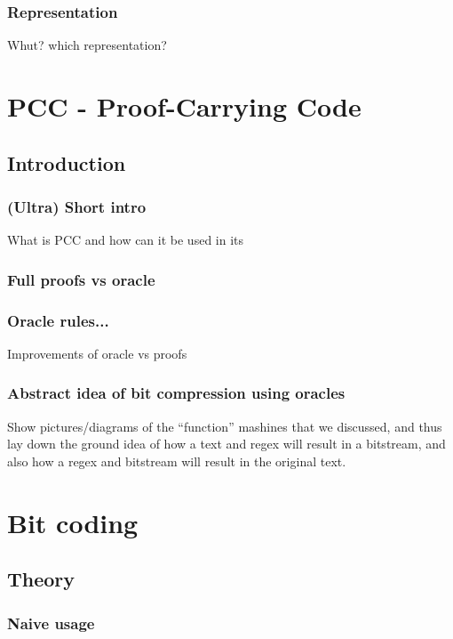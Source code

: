 \documentclass[slidestop,compress,mathserif, xcolor=table]{beamer}
\begin{document}
\begin{frame}
  \frametitle{Representation}
  
  Whut? which representation?

\end{frame}


\section{PCC - Proof-Carrying Code}

\subsection{Introduction}

\begin{frame}
  \frametitle{(Ultra) Short intro}
  
  What is PCC and how can it be used in its 

\end{frame}

\begin{frame}
  \frametitle{Full proofs vs oracle}
  
\end{frame}

\begin{frame}
  \frametitle{Oracle rules...}

  Improvements of oracle vs proofs
  
\end{frame}


\begin{frame}
  \frametitle{Abstract idea of bit compression using oracles}
  
  Show pictures/diagrams of the ``function'' mashines that we discussed, and
  thus lay down the ground idea of how a text and regex will result in a
  bitstream, and also how a regex and bitstream will result in the original text.

\end{frame}

\section{Bit coding}

\subsection{Theory}

\begin{frame}
  \frametitle{Naive usage}
  
\end{frame}
\end{document}
